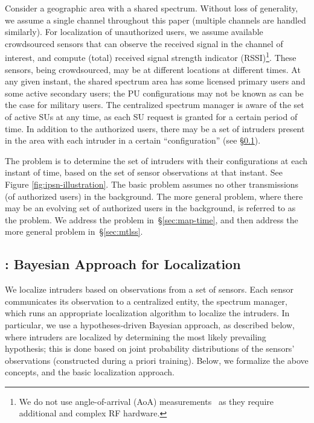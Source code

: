   Consider a geographic
area with a shared spectrum. Without loss of generality, we assume a
single channel throughout this paper (multiple channels are handled
similarly). For localization of unauthorized users, we assume
available crowdsourced sensors that can observe the received signal in the
channel of interest, and compute (total) received signal strength
indicator (RSSI)\footnote{We do not use angle-of-arrival (AoA)
    measurements~\cite{aoa-multi} as they require additional and
    complex RF hardware.}. These sensors, being crowdsourced, may be at
  different locations at different times.  At any given instant, the
  shared spectrum area has some licensed primary users and some active
  secondary users; the PU configurations may not be known as can be
  the case for military users. The centralized spectrum manager is
  aware of the set of active SUs at any time, as each SU request is
  granted for a certain period of time.
In addition to the authorized users, there may be a set of intruders
present in the area with each intruder in a certain ``configuration''
(see \S\ref{sec:map}).

The \mtl problem is to determine the set of intruders with their
configurations at each instant of time, based on the set of sensor
observations at that instant. See Figure \ref{fig:ipsn-illustration}. 
The basic \mtl problem assumes no other
transmissions (of authorized users) in the background.
The more general \mtl problem, where there may be an evolving set of
authorized users in the background, is referred to as the \mtlss
problem.  We address the \mtl problem in~\S\ref{sec:map-time}, and
then address the more general \mtlss problem in~\S\ref{sec:mtlss}.




\subsection{\map: Bayesian Approach for Localization}
\label{sec:map}

We localize intruders based on observations from a set of
sensors. Each sensor communicates its observation to a centralized
entity, the spectrum manager, which runs an appropriate
localization algorithm to localize the intruders.
In particular, we use a hypotheses-driven Bayesian approach, as
described below, where intruders are localized by determining the
most likely prevailing hypothesis; this is done based on joint
probability distributions of the sensors' observations (constructed
during a priori training). Below, we formalize the above concepts, and
the basic localization approach.

